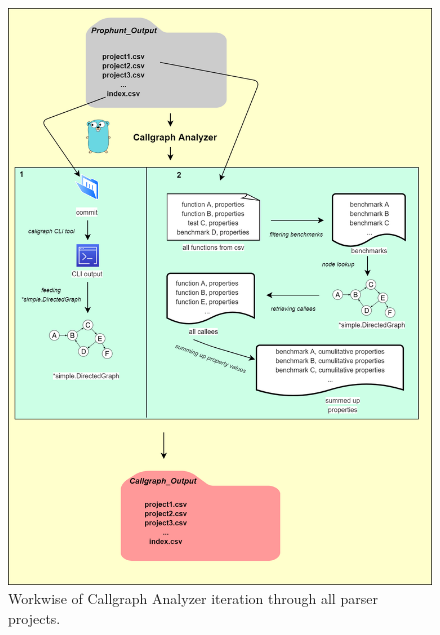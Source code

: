 \documentclass{seal_thesis}
\begin{document}
\begin{figure}[H]
	\centering
	\includegraphics[width=\linewidth]{callgraph}
	\caption{Workwise of Callgraph Analyzer iteration through all parser projects.}
	\label{fig:callgraph}
\end{figure}
 
\end{document}
